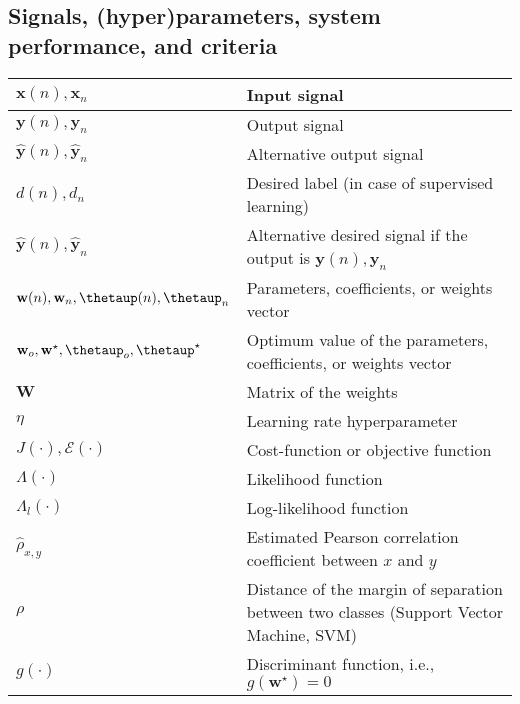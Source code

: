 \documentclass{article}
\begin{document}
\subsection{Signals, (hyper)parameters, system performance, and criteria}
\begin{xltabular}{\textwidth}{XX}
    \(\mathbf{x}(n), \mathbf{x}_n\)                                                                 & Input signal \\ \hline
    \(\mathbf{y}(n), \mathbf{y}_n\)                                                                 & Output signal \\ \hline
    \(\hat{\mathbf{y}}(n), \hat{\mathbf{y}}_n\)                                                     & Alternative output signal \\ \hline
    \(d(n), d_n\)                                                                                   & Desired label (in case of supervised learning) \\ \hline
    \(\hat{\mathbf{y}}(n), \hat{\mathbf{y}}_n\)                                                     & Alternative desired signal if the output is \(\mathbf{y}(n), \mathbf{y}_n\) \\ \hline
    \(\mathbf{w}(n), \mathbf{w}_n, \boldsymbol{\thetaup}(n), \boldsymbol{\thetaup}_n\)              & Parameters, coefficients, or weights vector \\ \hline
    \(\mathbf{w}_o, \mathbf{w}^{\star}, \boldsymbol{\thetaup}_o, \boldsymbol{\thetaup}^{\star}\)    & Optimum value of the parameters, coefficients, or weights vector \\ \hline
    \(\mathbf{W}\)                                                                                  & Matrix of the weights \\ \hline
    \(\eta\)                                                                                        & Learning rate hyperparameter \\ \hline
    \(J(\cdot), \mathcal{E}(\cdot)\)                                                                & Cost-function or objective function\\ \hline
    \(\Lambda(\cdot)\)                                                                              & Likelihood function\\ \hline
    \(\Lambda_l(\cdot)\)                                                                            & Log-likelihood function\\ \hline
    \(\hat{\rho}_{x,y}\)                                                                            & Estimated Pearson correlation coefficient between \(x\) and \(y\)\\ \hline
    \(\rho\)                                                                                        & Distance of the margin of separation between two classes (Support Vector Machine, SVM) \\ \hline
    \(g(\cdot)\)                                                                                    & Discriminant function, i.e., \(g(\mathbf{w}^{\star}) = 0\)
\end{xltabular}
\end{document}
